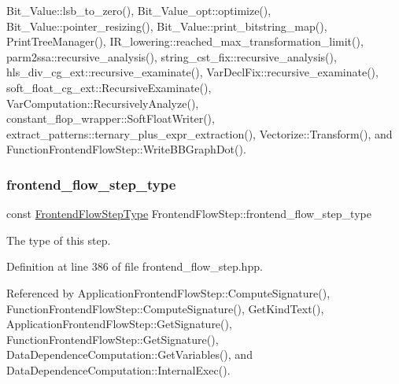 Bit\+\_\+\+Value\+::lsb\+\_\+to\+\_\+zero(), Bit\+\_\+\+Value\+\_\+opt\+::optimize(), Bit\+\_\+\+Value\+::pointer\+\_\+resizing(), Bit\+\_\+\+Value\+::print\+\_\+bitstring\+\_\+map(), Print\+Tree\+Manager(), I\+R\+\_\+lowering\+::reached\+\_\+max\+\_\+transformation\+\_\+limit(), parm2ssa\+::recursive\+\_\+analysis(), string\+\_\+cst\+\_\+fix\+::recursive\+\_\+analysis(), hls\+\_\+div\+\_\+cg\+\_\+ext\+::recursive\+\_\+examinate(), Var\+Decl\+Fix\+::recursive\+\_\+examinate(), soft\+\_\+float\+\_\+cg\+\_\+ext\+::\+Recursive\+Examinate(), Var\+Computation\+::\+Recursively\+Analyze(), constant\+\_\+flop\+\_\+wrapper\+::\+Soft\+Float\+Writer(), extract\+\_\+patterns\+::ternary\+\_\+plus\+\_\+expr\+\_\+extraction(), Vectorize\+::\+Transform(), and Function\+Frontend\+Flow\+Step\+::\+Write\+B\+B\+Graph\+Dot().

\mbox{\label{classFrontendFlowStep_ad49067d6a17119d47316149ab757b60d}} 
\subsubsection{\texorpdfstring{frontend\+\_\+flow\+\_\+step\+\_\+type}{frontend\_flow\_step\_type}}
{\footnotesize\ttfamily const \hyperlink{frontend__flow__step_8hpp_afeb3716c693d2b2e4ed3e6d04c3b63bb}{Frontend\+Flow\+Step\+Type} Frontend\+Flow\+Step\+::frontend\+\_\+flow\+\_\+step\+\_\+type\hspace{0.3cm}{\ttfamily [protected]}}



The type of this step. 



Definition at line 386 of file frontend\+\_\+flow\+\_\+step.\+hpp.



Referenced by Application\+Frontend\+Flow\+Step\+::\+Compute\+Signature(), Function\+Frontend\+Flow\+Step\+::\+Compute\+Signature(), Get\+Kind\+Text(), Application\+Frontend\+Flow\+Step\+::\+Get\+Signature(), Function\+Frontend\+Flow\+Step\+::\+Get\+Signature(), Data\+Dependence\+Computation\+::\+Get\+Variables(), and Data\+Dependence\+Computation\+::\+Internal\+Exec().

\mbox{\label{classFrontendFlowStep_aa22bfdf7687689934042882df869c7ec}} 
